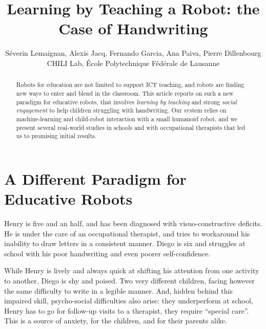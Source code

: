 \documentclass{article}
\title{Learning by Teaching a Robot: the Case of Handwriting}
\author{S\'everin Lemaignan, Alexis Jacq, Fernando Garcia, Ana Paiva, Pierre
Dillenbourg \\ CHILI Lab, \'Ecole Polytechnique F\'ed\'erale de Lausanne}
\begin{document}
\maketitle

\begin{abstract}

    Robots for education are not limited to support ICT teaching, and robots are
    finding new ways to enter and blend in the classroom. This article reports
    on such a new paradigm for educative robots, that involves \emph{learning by
    teaching} and strong \emph{social engagement} to help children struggling
    with handwriting. Our system relies on machine-learning and child-robot
    interaction with a small humanoid robot, and we present several real-world
    studies in schools and with occupational therapists that led us to promising
    initial results.

\end{abstract}


\section{A Different Paradigm for Educative Robots}

Henry is five and an half, and has been diagnosed with visuo-constructive
deficits. He is under the care of an occupational therapist, and tries to
workaround his inability to draw letters in a consistent manner. Diego is six
and struggles at school with his poor handwriting and even poorer
self-confidence.

While Henry is lively and always quick at shifting his attention from one
activity to another, Diego is shy and poised. Two very different children,
facing however the same difficulty to write in a legible manner. And, hidden
behind this impaired skill, psycho-social difficulties also arise: they
underperform at school, Henry has to go for follow-up visits to a therapist,
they require ``special care''. This is a source of anxiety, for the children,
and for their parents alike.
\end{document}
